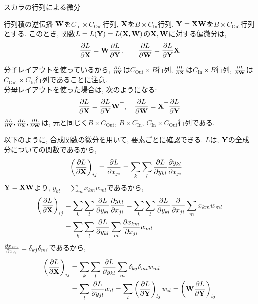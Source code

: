 \documentclass[dvipdfmx,notheorems,t]{beamer}
\begin{document}
\begin{frame}{スカラの行列による微分}
\begin{block}{行列積の逆伝播}
  $\vb{W}$を$C_\mathrm{In} \times C_\mathrm{Out}$行列, $\vb{X}$を$B \times C_\mathrm{In}$行列,
  $\vb{Y} = \vb{X} \vb{W}$を$B \times C_\mathrm{Out}$行列とする.
  このとき, 関数$L = L(\vb{Y}) = L(\vb{X}, \vb{W})$の$\vb{X}, \vb{W}$に対する偏微分は,
  \begin{align*}
    \pdv{L}{\vb{X}} = \vb{W} \pdv{L}{\vb{Y}}, \qquad
    \pdv{L}{\vb{W}} = \pdv{L}{\vb{Y}} \vb{X}
  \end{align*}
\end{block}

分子レイアウトを使っているから, $\pdv{L}{\vb{Y}}$は$C_\mathrm{Out} \times B$行列,
$\pdv{L}{\vb{X}}$は$C_\mathrm{In} \times B$行列,
$\pdv{L}{\vb{W}}$は$C_\mathrm{Out} \times C_\mathrm{In}$行列であることに注意. \\
分母レイアウトを使った場合は, 次のようになる:
\begin{align*}
  \pdv{L}{\vb{X}} = \pdv{L}{\vb{Y}} \vb{W}^\top, \quad
  \pdv{L}{\vb{W}} = \vb{X}^\top \pdv{L}{\vb{Y}}
\end{align*}
$\pdv{L}{\vb{Y}}, \pdv{L}{\vb{X}}, \pdv{L}{\vb{W}}$は,
元と同じく$B \times C_\mathrm{Out}$, $B \times C_\mathrm{In}$, $C_\mathrm{In} \times C_\mathrm{Out}$行列である.

以下のように, 合成関数の微分を用いて, 要素ごとに確認できる.
$L$は, $\vb{Y}$の全成分についての関数であるから,
\begin{align*}
  \left( \pdv{L}{\vb{X}} \right)_{ij} &= \pdv{L}{x_{ji}}
    = \sum_k \sum_l \pdv{L}{y_{kl}} \pdv{y_{kl}}{x_{ji}}
\end{align*}
$\vb{Y} = \vb{X} \vb{W}$より, $y_{kl} = \sum_m x_{km} w_{ml}$であるから,
\begin{align*}
  \left( \pdv{L}{\vb{X}} \right)_{ij}
    &= \sum_k \sum_l \pdv{L}{y_{kl}} \pdv{y_{kl}}{x_{ji}}
    = \sum_k \sum_l \pdv{L}{y_{kl}} \pdv{x_{ji}} \sum_m x_{km} w_{ml} \\
    &= \sum_k \sum_l \pdv{L}{y_{kl}} \sum_m \pdv{x_{km}}{x_{ji}} w_{ml}
\end{align*}
$\pdv{x_{km}}{x_{ji}} = \delta_{kj} \delta_{mi}$であるから,
\begin{align*}
  \left( \pdv{L}{\vb{X}} \right)_{ij}
    &= \sum_k \sum_l \pdv{L}{y_{kl}} \sum_m \delta_{kj} \delta_{mi} w_{ml} \\
    &= \sum_l \pdv{L}{y_{jl}} w_{il}
    = \sum_l \left( \pdv{L}{\vb{Y}} \right)_{lj} w_{il}
    = \left( \vb{W} \pdv{L}{\vb{Y}} \right)_{ij}
\end{align*}


\end{frame}
\end{document}
